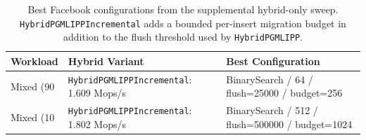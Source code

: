 \begin{table}[h]
\centering
\scriptsize
\setlength{\tabcolsep}{4pt}
\begin{tabular}{p{2.2in}p{1.0in}p{2.2in}}
\toprule
Workload & Hybrid Variant & Best Configuration \\
\midrule
Mixed (90%
 & \texttt{HybridPGMLIPPIncremental}: 1.609 Mops/s & BinarySearch / 64 / flush=25000 / budget=256 \\
\addlinespace
Mixed (10%
 & \texttt{HybridPGMLIPPIncremental}: 1.802 Mops/s & BinarySearch / 512 / flush=500000 / budget=1024 \\
\bottomrule
\end{tabular}
\caption{Best Facebook configurations from the supplemental hybrid-only sweep. \texttt{HybridPGMLIPPIncremental} adds a bounded per-insert migration budget in addition to the flush threshold used by \texttt{HybridPGMLIPP}.}
\end{table}
